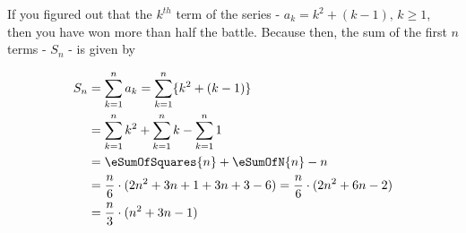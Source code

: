 \begin{solution}[\halfpage]
	If you figured out that the $k^{th}$ term of the series - $a_k = k^2 + (k-1),\, k \geq 1$, then
	you have won more than half the battle. Because then, the sum of the first $n$ terms - $S_n$ -
	is given by
	
	\begin{align}
		S_n &= \sum_{k=1}^{n}a_k = \sum_{k=1}^{n}\lbrace k^2 + (k-1)\rbrace \\
		&= \sum_{k=1}^{n}k^2 + \sum_{k=1}^{n}k - \sum_{k=1}^{n}1 \\
		&= \eSumOfSquares{n} + \eSumOfN{n} - n \\
		&= \dfrac{n}{6}\cdot(2n^2+3n+1 + 3n+3 - 6) = \dfrac{n}{6}\cdot(2n^2+6n-2) \\
		&= \dfrac{n}{3}\cdot(n^2+3n-1)
	\end{align}
\end{solution}
